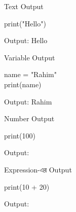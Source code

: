 \noindent
\begin{minipage}[t]{0.49\linewidth}

\begin{examplebox}{Text Output}

\begin{codebox}
\begin{english}
\ttfamily
print("Hello")
\end{english}
\end{codebox}

Output:
\textenglish{\ttfamily Hello}

\end{examplebox}

\begin{examplebox}{Variable Output}

\begin{codebox}
\begin{english}
\ttfamily
name = "Rahim"\\
print(name)
\end{english}
\end{codebox}

Output:
\textenglish{\ttfamily Rahim}

\end{examplebox}

\end{minipage}
\hfill
\begin{minipage}[t]{0.49\linewidth}

\begin{examplebox}{Number Output}

\begin{codebox}
\begin{english}
\ttfamily
print(100)
\end{english}
\end{codebox}

Output:
\textenglish{}

\end{examplebox}

\begin{examplebox}{Expression-এর Output}

\begin{codebox}
\begin{english}
\ttfamily
print(10 + 20)
\end{english}
\end{codebox}

Output:
\textenglish{}

\end{examplebox}

\end{minipage}

